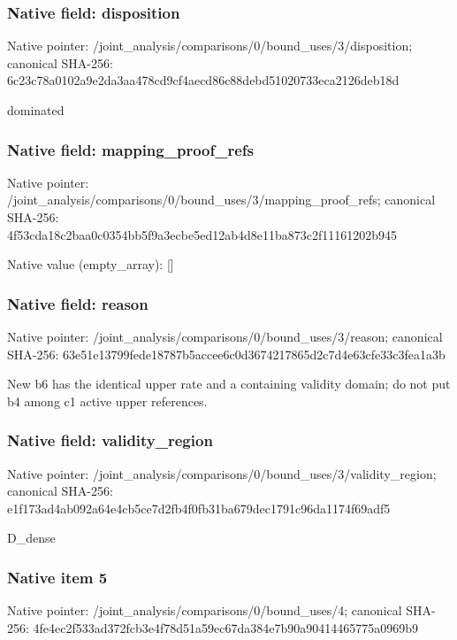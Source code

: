 \documentclass[10pt,a4paper]{article}
\begin{document}
\subsubsection{Native field: disposition}
Native pointer: /joint\_\allowbreak{}analysis/comparisons/0/bound\_\allowbreak{}uses/3/disposition; canonical SHA-256: 6c23c78a0102a9e2da3aa478cd9cf4aecd86c88debd51020733eca2126deb18d

\begingroup\raggedright\sloppy dominated\par\endgroup

\subsubsection{Native field: mapping\_\allowbreak{}proof\_\allowbreak{}refs}
Native pointer: /joint\_\allowbreak{}analysis/comparisons/0/bound\_\allowbreak{}uses/3/mapping\_\allowbreak{}proof\_\allowbreak{}refs; canonical SHA-256: 4f53cda18c2baa0c0354bb5f9a3ecbe5ed12ab4d8e11ba873c2f11161202b945

Native value (empty\_\allowbreak{}array): []

\subsubsection{Native field: reason}
Native pointer: /joint\_\allowbreak{}analysis/comparisons/0/bound\_\allowbreak{}uses/3/reason; canonical SHA-256: 63e51e13799fede18787b5accee6c0d3674217865d2c7d4e63cfe33c3fea1a3b

\begingroup\raggedright\sloppy New b6 has the identical upper rate and a containing validity domain;\allowbreak{} do not put b4 among c1 active upper references.\par\endgroup

\subsubsection{Native field: validity\_\allowbreak{}region}
Native pointer: /joint\_\allowbreak{}analysis/comparisons/0/bound\_\allowbreak{}uses/3/validity\_\allowbreak{}region; canonical SHA-256: e1f173ad4ab092a64e4cb5ce7d2fb4f0fb31ba679dec1791c96da1174f69adf5

\begingroup\raggedright\sloppy D\_\allowbreak{}dense\par\endgroup

\subsubsection{Native item 5}
Native pointer: /joint\_\allowbreak{}analysis/comparisons/0/bound\_\allowbreak{}uses/4; canonical SHA-256: 4fe4ec2f533ad372fcb3e4f78d51a59ec67da384e7b90a90414465775a0969b9
\end{document}
